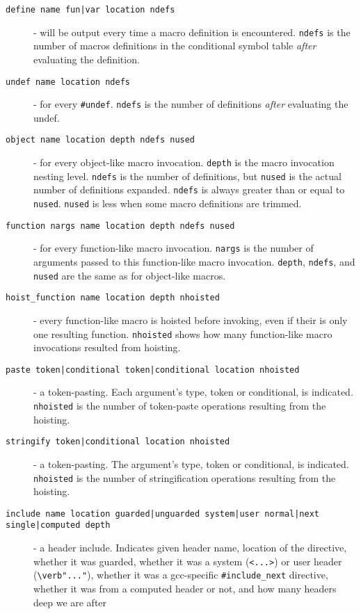\documentclass{report}
\begin{document}
\begin{description}
\item[\texttt{define name fun|var location ndefs}] - will be output every
  time a macro definition is encountered.  \verb"ndefs" is the number of
  macros definitions in the conditional symbol table \emph{after}
  evaluating the definition.
\item[\texttt{undef name location ndefs}] - for every \verb"#undef". \verb"ndefs" is the
  number of definitions \emph{after} evaluating the undef.
\item[\texttt{object name location depth ndefs nused}] - for every
  object-like macro invocation.  \verb"depth" is the macro invocation
  nesting level.  \verb"ndefs" is the number of definitions, but \verb"nused" is
  the actual number of definitions expanded.  \verb"ndefs" is always
  greater than or equal to \verb"nused".  \verb"nused" is less when some macro
  definitions are trimmed.
\item[\texttt{function nargs name location depth ndefs nused}] - for every
  function-like macro invocation.  \verb"nargs" is the number of arguments
  passed to this function-like macro invocation.  \verb"depth", \verb"ndefs",
  and \verb"nused" are the same as for object-like macros.
\item[\texttt{hoist\_function name location depth nhoisted}] - every function-like
  macro is hoisted before invoking, even if their is only one
  resulting function.  \verb"nhoisted" shows how many function-like macro
  invocations resulted from hoisting.
\item[\texttt{paste token|conditional token|conditional location nhoisted}] -
  a token-pasting.  Each argument's type, token or conditional, is
  indicated.  \verb"nhoisted" is the number of token-paste operations
  resulting from the hoisting.
\item[\texttt{stringify token|conditional location nhoisted}] - a
  token-pasting.  The argument's type, token or conditional, is
  indicated.  \verb"nhoisted" is the number of stringification operations
  resulting from the hoisting.
\item[\texttt{include name location guarded|unguarded system|user normal|next
  single|computed depth}] - a header include.  Indicates given header
  name, location of the directive, whether it was guarded, whether it
  was a system (\verb"<...>") or user header (\verb'\verb"..."'), whether it was
  a gcc-specific \verb"#include_next" directive, whether it was from a
  computed header or not, and how many headers deep we are after

\end{description}
\end{document}
